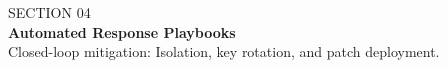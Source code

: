 \documentclass[aspectratio=169, 10pt]{beamer}
\begin{document}
\begin{frame}[plain]
  \vfill
  \begin{tcolorbox}[
    enhanced,
    colback=bgcard,
    colframe=cyberpurple,
    arc=4pt,
    boxrule=1.2pt,
    left=15pt, right=15pt, top=15pt, bottom=15pt
  ]
    {\ttfamily\color{cyberpurple}\large SECTION 04} \\[4pt]
    {\Huge\bfseries\color{textlight} Automated Response Playbooks} \\[8pt]
    {\color{textmuted}\small Closed-loop mitigation: Isolation, key rotation, and patch deployment.}
  \end{tcolorbox}
  \vfill
\end{frame}
\end{document}
